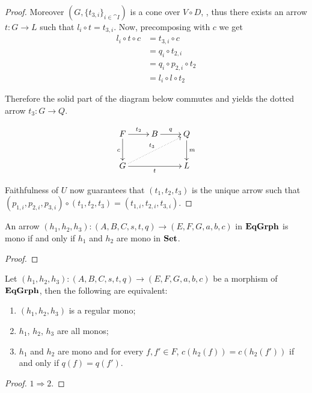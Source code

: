 {\begin{proof}
        Moreover $(G, \{t_{3,i}\}_{i\in \cat{I}})$ is a cone over $V\circ D$, , thus there exists an arrow $t\colon G\to L$ such that $l_i\circ t =t_{3,i}$. Now, precomposing with $c$ we get
	\begin{align*}
		l_i\circ t\circ c&=t_{3,i}\circ c\\&=q_i\circ t_{2,i}\\&=q_i\circ p_{2,i}\circ t_2\\&=l_i\circ l\circ t_2
	\end{align*} 
	
	Therefore the solid part of the diagram below commutes and  yields the dotted arrow $t_3\colon G\to Q$.
	
	\[\xymatrix{F \ar[r]^{t_2} \ar[d]_{c}& B \ar[r]^{q} & Q \ar[d]^{m}\\G \ar[rr]_{t} \ar@{.>}[urr]^{t_3}&& L}\]
	
	Faithfulness of $U$ now guarantees that $(t_1, t_2, t_3)$ is the unique arrow such that $(p_{1,i}, p_{2,i}, p_{3,i})\circ(t_1, t_2, t_3)=(t_{1,i},t_{2, i}, t_{3,i})$.	
\end{proof}




\begin{cor}
	An arrow $(h_1, h_2, h_3)\colon (A, B, C, s,t, q)\to (E, F, G, a,b,c)$ in $\mathbf{EqGrph}$ is mono if and only if $h_1$ and $h_2$ are mono in $\mathbf{Set}$.
\end{cor}
\begin{proof}
\end{proof}



\begin{cor}\label{cor:regmono}Let $(h_1, h_2, h_3)\colon (A, B, C, s,t, q)\to (E, F, G, a,b,c)$ be a morphism of $\mathbf{EqGrph}$, then the following are equivalent:
	\begin{enumerate}
		\item $(h_1, h_2, h_3)$ is a regular mono;
		\item $h_1$, $h_2$, $h_3$ are all monos;
		\item $h_1$ and $h_2$ are mono and for every $f, f'\in F$, $c(h_2(f))=c(h_2(f'))$ if and only if $q(f)=q(f')$.
	\end{enumerate}
\end{cor}
\begin{proof}
	$1\Rightarrow 2.$  
	

\end{proof}}
